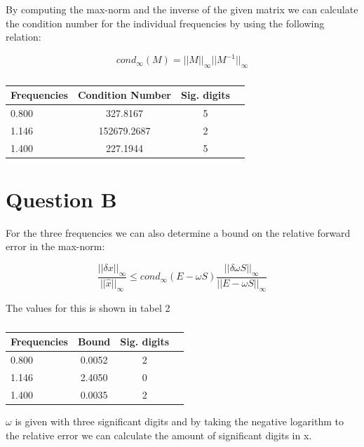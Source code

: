 \documentclass[a4paper,12pkt]{report}
\begin{document}
By computing the max-norm and the inverse of the given matrix we can calculate the condition number for the individual frequencies by using the following relation:

\begin{equation}
    cond_{\infty}(M) = ||M||_{\infty}||M^{-1}||_{\infty}
\end{equation}



\begin{table}[h!]
    \centering
    \begin{tabular}{l  c  c  c }
    \hline
     Frequencies & Condition Number & Sig. digits \\ \hline
     0.800 & 327.8167 & 5\\
     1.146 & 152679.2687 & 2\\
     1.400 & 227.1944 & 5
    \end{tabular}
    \caption{}
    \label{Confusion matrix scores}
\end{table}

\section*{Question B}

For the three frequencies we can also determine a bound on the relative forward error in the max-norm:

\begin{equation}
    \frac{||\delta x||_{\infty}}{||\hat{x}||_{\infty}} \leq cond_{\infty}(E-\omega S) \frac{||\delta \omega S||_{\infty}}{||E-\omega S||_{\infty}}
\end{equation}

The values for this is shown in tabel 2 

\begin{table}[h!]
    \centering
    \begin{tabular}{l  c  c  c }
    \hline
     Frequencies & Bound & Sig. digits\\ \hline
     0.800 & 0.0052 & 2 \\
     1.146 & 2.4050 & 0 \\
     1.400 & 0.0035 & 2
    \end{tabular}
    \caption{}
\end{table}

$\omega$ is given with three significant digits and by taking the negative logarithm to the relative error we can calculate the amount of significant digits in x.
\end{document}
